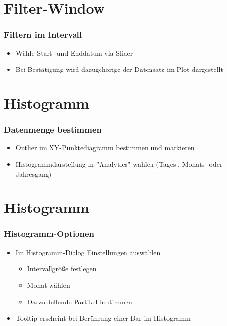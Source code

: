 \documentclass{beamer}
\begin{document}
    \section{Filter-Window}
    \begin{frame}
			\frametitle{Filtern im Intervall }
			\begin{itemize}
				\setlength\itemsep{1em}
				\item Wähle Start- und Enddatum via Slider
				\item Bei Bestätigung wird dazugehörige der Datensatz im Plot dargestellt
			\end{itemize}
    \end{frame}
    
    \section{Histogramm}
    \begin{frame}
			\frametitle{Datenmenge bestimmen}
			\begin{itemize}
				\setlength\itemsep{1em}
				\item Outlier im XY-Punktediagramm bestimmen und markieren				
				\item Histogrammdarstellung in ''Analytics''  wählen (Tages-, Monats- oder Jahresgang)
			\end{itemize}
    \end{frame}
    
    \section{Histogramm}
    \begin{frame}
			\frametitle{Histogramm-Optionen}
			\begin{itemize}
				\setlength\itemsep{1em}
				\item Im Histogramm-Dialog Einstellungen auswählen
				\begin{itemize}
					\setlength\itemsep{1em}
					\item Intervallgröße festlegen 
					\item Monat wählen
					\item Darzustellende Partikel bestimmen				
				\end{itemize}
				\item Tooltip erscheint bei Berührung einer Bar im Histogramm				
			\end{itemize}
    \end{frame}
\end{document}
